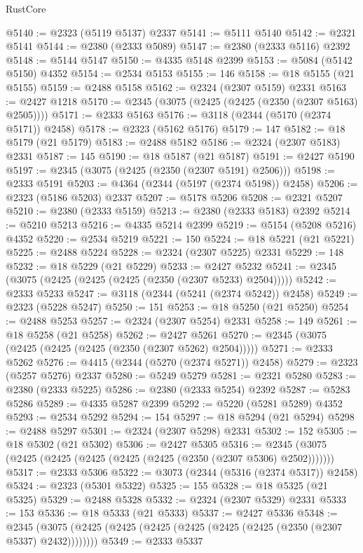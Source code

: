 \begin{lexlean}{RustCore}
\begin{coremodule}
@5140 := @2323 (@5119 @5137) @2337
@5141 := @5111 @5140
@5142 := @2321 @5141
@5144 := @2380 (@2333 @5089)
@5147 := @2380 (@2333 @5116) @2392
@5148 := @5144 @5147
@5150 := @4335 @5148 @2399
@5153 := @5084 (@5142 @5150) @4352
@5154 := @2534 @5153
@5155 := 146
@5158 := @18 @5155 (@21 @5155)
@5159 := @2488 @5158
@5162 := @2324 (@2307 @5159) @2331
@5163 := @2427 @1218
@5170 := @2345 (@3075 (@2425 (@2425 (@2350 (@2307 @5163) @2505))))
@5171 := @2333 @5163
@5176 := @3118 (@2344 (@5170 (@2374 @5171)) @2458)
@5178 := @2323 (@5162 @5176)
@5179 := 147
@5182 := @18 @5179 (@21 @5179)
@5183 := @2488 @5182
@5186 := @2324 (@2307 @5183) @2331
@5187 := 145
@5190 := @18 @5187 (@21 @5187)
@5191 := @2427 @5190
@5197 := @2345 (@3075 (@2425 (@2350 (@2307 @5191) @2506)))
@5198 := @2333 @5191
@5203 := @4364 (@2344 (@5197 (@2374 @5198)) @2458)
@5206 := @2323 (@5186 @5203) @2337
@5207 := @5178 @5206
@5208 := @2321 @5207
@5210 := @2380 (@2333 @5159)
@5213 := @2380 (@2333 @5183) @2392
@5214 := @5210 @5213
@5216 := @4335 @5214 @2399
@5219 := @5154 (@5208 @5216) @4352
@5220 := @2534 @5219
@5221 := 150
@5224 := @18 @5221 (@21 @5221)
@5225 := @2488 @5224
@5228 := @2324 (@2307 @5225) @2331
@5229 := 148
@5232 := @18 @5229 (@21 @5229)
@5233 := @2427 @5232
@5241 := @2345 (@3075 (@2425 (@2425 (@2425 (@2350 (@2307 @5233) @2504)))))
@5242 := @2333 @5233
@5247 := @3118 (@2344 (@5241 (@2374 @5242)) @2458)
@5249 := @2323 (@5228 @5247)
@5250 := 151
@5253 := @18 @5250 (@21 @5250)
@5254 := @2488 @5253
@5257 := @2324 (@2307 @5254) @2331
@5258 := 149
@5261 := @18 @5258 (@21 @5258)
@5262 := @2427 @5261
@5270 := @2345 (@3075 (@2425 (@2425 (@2425 (@2350 (@2307 @5262) @2504)))))
@5271 := @2333 @5262
@5276 := @4415 (@2344 (@5270 (@2374 @5271)) @2458)
@5279 := @2323 (@5257 @5276) @2337
@5280 := @5249 @5279
@5281 := @2321 @5280
@5283 := @2380 (@2333 @5225)
@5286 := @2380 (@2333 @5254) @2392
@5287 := @5283 @5286
@5289 := @4335 @5287 @2399
@5292 := @5220 (@5281 @5289) @4352
@5293 := @2534 @5292
@5294 := 154
@5297 := @18 @5294 (@21 @5294)
@5298 := @2488 @5297
@5301 := @2324 (@2307 @5298) @2331
@5302 := 152
@5305 := @18 @5302 (@21 @5302)
@5306 := @2427 @5305
@5316 := @2345 (@3075 (@2425 (@2425 (@2425 (@2425 (@2425 (@2350 (@2307 @5306) @2502)))))))
@5317 := @2333 @5306
@5322 := @3073 (@2344 (@5316 (@2374 @5317)) @2458)
@5324 := @2323 (@5301 @5322)
@5325 := 155
@5328 := @18 @5325 (@21 @5325)
@5329 := @2488 @5328
@5332 := @2324 (@2307 @5329) @2331
@5333 := 153
@5336 := @18 @5333 (@21 @5333)
@5337 := @2427 @5336
@5348 := @2345 (@3075 (@2425 (@2425 (@2425 (@2425 (@2425 (@2425 (@2350 (@2307 @5337) @2432))))))))
@5349 := @2333 @5337

\end{coremodule}
\end{lexlean}
